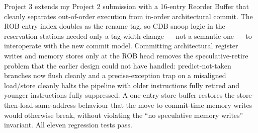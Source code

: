 \documentclass[11pt]{article}
\begin{document}
Project 3 extends my Project 2 submission with a 16-entry Reorder Buffer that
cleanly separates out-of-order execution from in-order architectural commit.
The ROB entry index doubles as the rename tag, so CDB snoop logic in the
reservation stations needed only a tag-width change --- not a semantic one ---
to interoperate with the new commit model. Committing architectural register
writes and memory stores only at the ROB head removes the speculative-retire
problem that the earlier design could not have handled: predict-not-taken
branches now flush cleanly and a precise-exception trap on a misaligned
load/store cleanly halts the pipeline with older instructions fully retired
and younger instructions fully suppressed. A one-entry store buffer restores
the store-then-load-same-address behaviour that the move to commit-time
memory writes would otherwise break, without violating the ``no speculative
memory writes'' invariant. All eleven regression tests pass.
\end{document}

